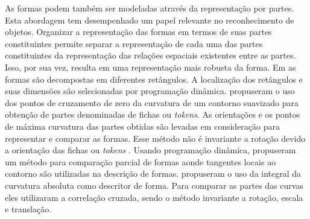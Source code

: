 As formas podem também ser modeladas através da representação por partes. Esta abordagem tem desempenhado um papel relevante no reconhecimento de objetos. Organizar a representação das formas em termos de suas partes constituintes permite separar a representação de cada uma das partes constituintes da representação das relações espaciais existentes entre as partes. Isso, por sua vez, resulta em uma representação mais robusta da forma.  Em \cite{Kenji:1992} as formas são decompostas em diferentes retângulos. A localização dos retângulos e suas dimensões são selecionadas por programação dinâmica.  propuseram o uso dos pontos de cruzamento de zero da curvatura de um contorno suavizado para obtenção de partes denominadas de fichas ou \textit{tokens}. As orientações e os pontos de máxima curvatura das partes obtidas são levadas em consideração para representar e comparar as formas. Esse método não é invariante a rotação devido a orientação das fichas ou \textit{tokens} \cite{DiRuberto:2009}. Usando programação dinâmica,  propuseram um método para comparação parcial de formas aonde tangentes locais ao contorno são utilizadas na descrição de formas.  propuseram o uso da integral da curvatura absoluta como descritor de forma. Para comparar as partes das curvas eles utilizaram a correlação cruzada, sendo o método invariante a rotação, escala e translação.  



